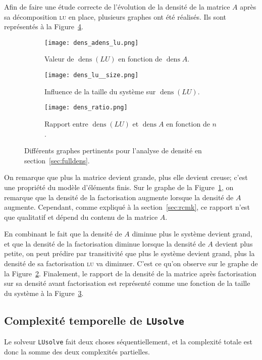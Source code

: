\documentclass[11pt]{article}
\DeclareMathOperator{\dens}{\mathrm{dens}}
\begin{document}
Afin de faire une étude correcte de l'évolution de la densité de la matrice $A$ après sa décomposition \textsc{lu} en place, plusieurs graphes ont été réalisés.
Ils sont représentés à la Figure~\ref{fig:full_density}.
\begin{figure}[H]
	\centering
	\begin{subfigure}[t]{0.27\textwidth}
		\centering
		\texttt{[image: dens\_adens\_lu.png]}
		\caption{Valeur de $\dens(LU)$ en fonction de $\dens A$.}
		\label{fig:a_dens__lu_dens}
	\end{subfigure}\hfill
	\begin{subfigure}[t]{0.27\textwidth}
		\centering
		\texttt{[image: dens\_lu\_\_size.png]}
		\caption{Influence de la taille du système sur $\dens (LU)$.}
		\label{fig:dens_lu__size}
	\end{subfigure}\hfill
	\begin{subfigure}[t]{0.27\textwidth}
		\centering
		\texttt{[image: dens\_ratio.png]}
		\caption{Rapport entre $\dens(LU)$ et $\dens A$ en fonction de $n$.}
		\label{fig:dens_ratio}
	\end{subfigure}
	\caption{Différents graphes pertinents pour l'analyse de densité en section~\ref{sec:fulldens}.}
	\label{fig:full_density}
\end{figure}
On remarque que plus la matrice devient grande, plus elle devient creuse; c'est une propriété du modèle d'éléments finis. Sur le graphe de la Figure~\ref{fig:a_dens__lu_dens}, on remarque que la densité de la factorisation augmente lorsque la densité de $A$ augmente. Cependant, comme expliqué à la section~\ref{sec:rcmk}, ce rapport n'est que qualitatif et dépend du contenu de la matrice $A$.

En combinant le fait que la densité de $A$ diminue plus le système devient grand, et que la densité de la factorisation diminue lorsque la densité de $A$ devient plus petite, on peut prédire par transitivité que plus le système devient grand, plus la densité de sa factorisation \textsc{lu} va diminuer.
C'est ce qu'on observe sur le graphe de la Figure~\ref{fig:dens_lu__size}.
Finalement, le rapport de la densité de la matrice après factorisation sur sa densité avant factorisation est représenté comme une fonction de la taille du système à la Figure~\ref{fig:dens_ratio}.

\subsection{Complexité temporelle de \texttt{LUsolve}}
Le solveur \lstinline|LUsolve| fait deux choses séquentiellement, et la complexité totale est donc la somme des deux complexités partielles.
\end{document}
